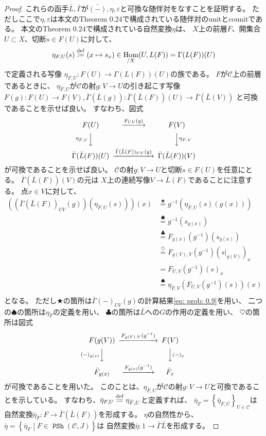 \documentclass[uplatex]{jsarticle}
\theoremstyle{definition}
\def\ep{\varepsilon}
\DeclareMathOperator{\Hom}{Hom}
\def\mcC{\mathcal{C}}
\newcommand{\dfn}{\overset{\mathrm{\tiny def}}{\coloneqq}}
\DeclareMathOperator{\PSh}{\mathtt{PSh}}
\begin{document}
\begin{proof}
  これらの函手\(\bar{L},\bar{\Gamma}\)が\(\bar{(-)},\eta,\ep\)と可換な随伴対をなすことを証明する。
  ただしここで\(\eta,\ep\)は本文のTheorem 0.24で構成されている随伴対のunitとcounitである。
  本文のTheorem 0.24で構成されている自然変換\(\eta\)は、
  \(X\)上の前層\(F\)、開集合\(U\subset X\)、切断\(s\in F(U)\)に対して、
  \[
  \eta_{F,U}(s) \dfn (x\mapsto s_x)\in \Hom_{/X}(U,L(F)) = \Gamma(L(F))(U)
  \]
  で定義される写像
  \(\eta_{F,U}:F(U)\to \Gamma(L(F))(U)\)の族である。
  \(F\)が\(\mcC\)上の前層であるときに、
  \(\eta_{\bar{F},U}\)が\(\mcC\)の射\(g:V\to U\)の引き起こす写像
  \(F(g):F(U)\to F(V),
  \bar{\Gamma}(\bar{L}(g)) : \bar{\Gamma}(\bar{L}(F))(U)\to \bar{\Gamma}(\bar{L}(V))\)
  と可換であることを示せば良い。
  すなわち、図式
  \[
  \begin{CD}
    F(U) @>F_{UV}(g)>> {F(V)} \\
    @V {\eta_{\bar{F},U}} VV @VV {\eta_{\bar{F},V}}V \\
    \bar{\Gamma}(\bar{L}(F))(U) @>\bar{\Gamma}(\bar{L}(F))_{UV}(g)>> \bar{\Gamma}(\bar{L}(F))(V)
  \end{CD}
  \]
  が可換であることを示せば良い。
  \(\mcC\)の射\(g:V\to U\)と切断\(s\in F(U)\)を任意にとる。
  \(\bar{\Gamma}(\bar{L}(F))(V)\)の元は
  \(X\)上の連続写像\(V\to \bar{L}(F)\)であることに注意する。
  点\(x\in V\)に対して、
  \begin{align*}
    \left(\left(\bar{\Gamma}(\bar{L}(F))_{UV}(g)\right)(\eta_{\bar{F},U}(s))\right)(x)
    &\overset{\bigstar}{=}
    g^{-1}(\eta_{\bar{F},U}(s)(g(x))) \\
    &\overset{\spadesuit}{=} g^{-1}(s_{g(x)}) \\
    &\overset{\clubsuit}{=} F_{g(x)}(g^{-1})(s_{g(x)}) \\
    &\overset{\heartsuit}{=} F_{g(V),V}(g^{-1})(s|_{g(V)})_x \\
    &= F_{U,V}(g^{-1})(s)_x \\
    &\overset{\spadesuit}{=} \eta_{\bar{F},V}(F_{U,V}(g^{-1})(s))(x) \\
  \end{align*}
  となる。
  ただし\(\bigstar\)の箇所は\(\bar{\Gamma}(-)_{UV}(g)\)の計算結果\eqref{eq: prob: 0.9}を用い、
  二つの\(\spadesuit\)の箇所は\(\eta_{\bar{F}}\)の定義を用い、
  \(\clubsuit\)の箇所は\(\bar{L}\)への\(G\)の作用の定義を用い、
  \(\heartsuit\)の箇所は図式
  \[
  \begin{CD}
    F(g(V)) @> F_{g(V),V}(g^{-1}) >> F(V) \\
    @ V(-)_{g(x)} VV @VV (-)_x V \\
    \bar{F}_{g(x)} @>F_{g(x)}(g^{-1}) >> \bar{F}_x
  \end{CD}
  \]
  が可換であることを用いた。
  このことは、\(\eta_{\bar{F},U}\)が\(\mcC\)の射\(g:V\to U\)と可換であることを示している。
  すなわち、\(\bar{\eta}_{F,U}\dfn \eta_{\bar{F},U}\)と定義すれば、
  \(\bar{\eta}_F = \left\{ \bar{\eta}_{F,U}\right\}_{U\in\mcC}\)は
  自然変換\(\bar{\eta}_F:F\to \bar{\Gamma}(\bar{L}(F))\)を形成する。
  \(\eta\)の自然性から、
  \(\bar{\eta} = \left\{ \bar{\eta}_F\middle| F\in \PSh(\mcC,J)\right\}\)は
  自然変換\(\bar{\eta}: 1\to \bar{\Gamma}\bar{L}\)を形成する。


\end{proof}
\end{document}
